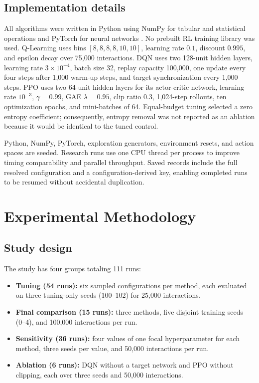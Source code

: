\documentclass[11pt]{article}
\begin{document}
\subsection{Implementation details}

All algorithms were written in Python using NumPy for tabular and statistical
operations and PyTorch for neural networks \citep{harris2020numpy,paszke2019pytorch}.
No prebuilt RL training library was used. Q-Learning uses bins
$[8,8,8,8,10,10]$, learning rate $0.1$, discount $0.995$, and epsilon decay over
75,000 interactions. DQN uses two 128-unit hidden layers, learning rate
$3\times10^{-4}$, batch size 32, replay capacity 100,000, one update every four
steps after 1,000 warm-up steps, and target synchronization every 1,000 steps.
PPO uses two 64-unit hidden layers for its actor-critic network, learning rate
$10^{-3}$, $\gamma=0.99$, GAE $\lambda=0.95$, clip ratio $0.3$, 1,024-step
rollouts, ten optimization epochs, and mini-batches of 64. Equal-budget tuning
selected a zero entropy coefficient; consequently, entropy removal was not
reported as an ablation because it would be identical to the tuned control.

Python, NumPy, PyTorch, exploration generators, environment resets, and action
spaces are seeded. Research runs use one CPU thread per process to improve timing
comparability and parallel throughput. Saved records include the full resolved
configuration and a configuration-derived key, enabling completed runs to be
resumed without accidental duplication.

\section{Experimental Methodology}

\subsection{Study design}

The study has four groups totaling 111 runs:
\begin{itemize}
  \item \textbf{Tuning (54 runs):} six sampled configurations per method, each
        evaluated on three tuning-only seeds (100--102) for 25,000 interactions.
  \item \textbf{Final comparison (15 runs):} three methods, five disjoint training
        seeds (0--4), and 100,000 interactions per run.
  \item \textbf{Sensitivity (36 runs):} four values of one focal hyperparameter
        for each method, three seeds per value, and 50,000 interactions per run.
  \item \textbf{Ablation (6 runs):} DQN without a target network and PPO without
        clipping, each over three seeds and 50,000 interactions.
\end{itemize}
\end{document}
